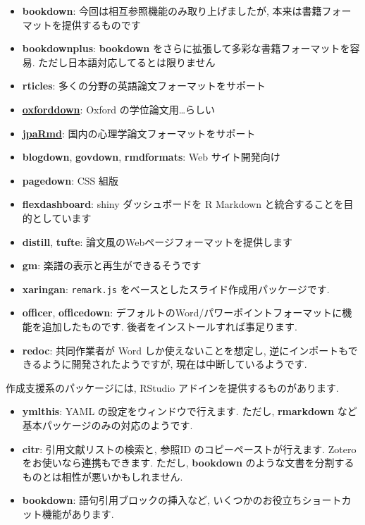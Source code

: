\documentclass[
]{ltjsarticle}
\providecommand{\tightlist}{%
  \setlength{\itemsep}{0pt}\setlength{\parskip}{0pt}}
\begin{document}
\begin{itemize}
\tightlist
\item
  \textbf{bookdown}: 今回は相互参照機能のみ取り上げましたが, 本来は書籍フォーマットを提供するものです
\item
  \textbf{bookdownplus}: \textbf{bookdown} をさらに拡張して多彩な書籍フォーマットを容易. ただし日本語対応してるとは限りません
\item
  \textbf{rticles}: 多くの分野の英語論文フォーマットをサポート
\item
  \href{https://github.com/ulyngs/oxforddown}{\textbf{oxforddown}}: Oxford の学位論文用\ldots らしい
\item
  \href{https://github.com/ykunisato/jpaRmd}{\textbf{jpaRmd}}: 国内の心理学論文フォーマットをサポート
\item
  \textbf{blogdown}, \textbf{govdown}, \textbf{rmdformats}: Web サイト開発向け
\item
  \textbf{pagedown}: CSS 組版
\item
  \textbf{flexdashboard}: shiny ダッシュボードを R Markdown と統合することを目的としています
\item
  \textbf{distill}, \textbf{tufte}: 論文風のWebページフォーマットを提供します
\item
  \textbf{gm}: 楽譜の表示と再生ができるそうです
\item
  \textbf{xaringan}: \texttt{remark.js} をベースとしたスライド作成用パッケージです.
\item
  \textbf{officer}, \textbf{officedown}: デフォルトのWord/パワーポイントフォーマットに機能を追加したものです. 後者をインストールすれば事足ります.
\item
  \textbf{redoc}: 共同作業者が Word しか使えないことを想定し, 逆にインポートもできるように開発されたようですが, 現在は中断しているようです.
\end{itemize}

作成支援系のパッケージには, RStudio アドインを提供するものがあります.

\begin{itemize}
\tightlist
\item
  \textbf{ymlthis}: YAML の設定をウィンドウで行えます. ただし, \textbf{rmarkdown} など基本パッケージのみの対応のようです.
\item
  \textbf{citr}: 引用文献リストの検索と, 参照ID のコピーペーストが行えます. Zotero をお使いなら連携もできます. ただし, \textbf{bookdown} のような文書を分割するものとは相性が悪いかもしれません.
\item
  \textbf{bookdown}: 語句引用ブロックの挿入など, いくつかのお役立ちショートカット機能があります.
\end{itemize}
\end{document}
